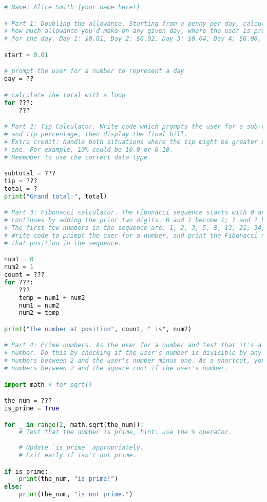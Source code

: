 \documentclass[letter,10pt]{article}
\begin{document}
    \begin{lstlisting}[language=python]
# Name: Alice Smith (your name here!)

# Part 1: Doubling the allowance. Starting from a penny per day, calculate
# how much allowance you'd make on any given day, where the user is prompted
# for the day. Day 1: $0.01, Day 2: $0.02, Day 3: $0.04, Day 4: $0.08, etc.

start = 0.01

# prompt the user for a number to represent a day
day = ??

# calculate the total with a loop
for ???:
    ???

# Part 2: Tip Calculator. Write code which prompts the user for a sub-total
# and tip percentage, then display the final bill.
# Extra credit: handle both situations where the tip might be greater or less than
# one. For example, 10% could be 10.0 or 0.10.
# Remember to use the correct data type.

subtotal = ???
tip = ???
total = ?
print("Grand total:", total)

# Part 3: Fibonacci calculator. The Fibonacci sequence starts with 0 and 1, and
# continues by adding the prior two digits. 0 and 1 become 1; 1 and 1 become 2; etc.
# The first few numbers in the sequence are: 1, 2, 3, 5, 8, 13, 21, 34, 55, 89.
# Write code to primpt the user for a number, and print the Fibonacci number at
# that position in the sequence.

num1 = 0
num2 = 1
count = ???
for ???:
    ???
    temp = num1 + num2
    num1 = num2
    num2 = temp

print("The number at position", count, " is", num2)

# Part 4: Prime numbers. As the user for a number and test that it's a prime
# number. Do this by checking if the user's number is divisible by any of the
# numbers between 2 and the user's number minus one. As a shortcut, you may check
# numbers between 2 and the square root if the user's number.

import math # for sqrt()

the_num = ???
is_prime = True

for _ in range(2, math.sqrt(the_num)):
    # Test that the number is prime, hint: use the % operator.
    
    # Update `is_prime` appropriately.
    # Exit early if isn't not prime.

if is_prime:
    print(the_num, "is prime!")
else:
    print(the_num, "is not prime.")
        
    \end{lstlisting}
    
\end{document}
